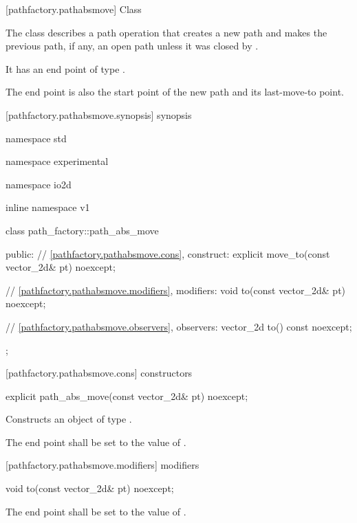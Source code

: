  [pathfactory.pathabsmove] {Class }

\pnum
{}
The class  describes a path operation that creates a new path and makes the previous path, if any, an open path unless it was closed by .

\pnum
It has an end point of type .

\pnum
The end point is also the start point of the new path and its last-move-to point.

 [pathfactory.pathabsmove.synopsis] { synopsis}

\begin{codeblock}
namespace std { namespace experimental { namespace io2d { inline namespace v1 {
  class path_factory::path_abs_move {
  public:
    // \ref{pathfactory.pathabsmove.cons}, construct:
    explicit move_to(const vector_2d& pt) noexcept;

    // \ref{pathfactory.pathabsmove.modifiers}, modifiers:
    void to(const vector_2d& pt) noexcept;

    // \ref{pathfactory.pathabsmove.observers}, observers:
    vector_2d to() const noexcept;
  };
} } } }
\end{codeblock}

 [pathfactory.pathabsmove.cons] { constructors}

\begin{itemdecl}
    explicit path_abs_move(const vector_2d& pt) noexcept;
\end{itemdecl}
\begin{itemdescr}
	\pnum
	\effects
	Constructs an object of type .
	
	\pnum
	The end point shall be set to the value of .
\end{itemdescr}

 [pathfactory.pathabsmove.modifiers]{ modifiers}

\begin{itemdecl}
    void to(const vector_2d& pt) noexcept;
\end{itemdecl}
\begin{itemdescr}
	\pnum
	\effects
	The end point shall be set to the value of .
\end{itemdescr}

